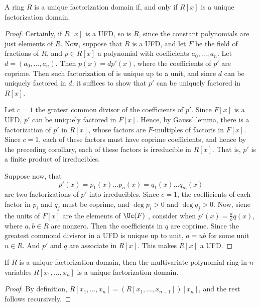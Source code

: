 \begin{theorem}\label{3.2.2}
    A ring $R$ is a unique factorization domain if, and only if  $R[x]$ is a
    unique factorization domain.
\end{theorem}
\begin{proof}
    Certainly, if $R[x]$ is a UFD, so is $R$, since the constant polynomials
    are just elements of  $R$. Now, suppose that  $R$ is a UFD, and let  $F$ be
    the field of fractions of  $R$, and  $p \in R[x]$ a polynomial with
    coefficients $a_0, \dots, a_n$. Let $d=(a_0, \dots, a_n)$. Then
    $p(x)=dp'(x)$, where the coefficients of $p'$ are coprime. Then such
    factorization of is unique up to a unit, and since $d$ can be uniquely
    factored in  $d$, it suffices to show that  $p'$ can be uniquely factored in
     $R[x]$.

     Let $c=1$ the gratest common divisor of the coefficients of  $p'$. Since
     $F[x]$ is a UFD, $p'$ can be uniquely factored in  $F[x]$. Hence, by
     Gauss' lemma, there is a factorization of $p'$ in  $R[x]$, whose factors
     are $F$-multiples of factoris in  $F[x]$. Since $c=1$, each of these
     factors must have coprime coefficients, and hence by the preceding
     corollary, each of these factors is irreducible in $R[x]$. That is, $p'$ is
     a finite product of irreducibles.

     Suppose now, that
     \begin{equation*}
      p'(x)=p_1(x) \dots p_n(x)=q_1(x) \dots q_m(x)
     \end{equation*}
     are two factorizations of $p'$ into irreducibles. Since  $c=1$, the
     coefficients of each factor in $p_i$ and  $q_j$ must be coprime, and
     $\deg{p_i}>0$ and $\deg{q_j}>0$. Now, sicne the units of $F[x]$ are the
     elements of $\Uc(F)$ , consider when $p'(x)=\frac{a}{b}q(x)$, where $a,b
     \in R$ are nonzero. Then the coefficients in $q$ are coprime. Since the
     greatest commond divisror in a UFD is unique up to unit,  $a=ub$ for some
     unit  $u \in R$. And  $p'$ and $q$ are associate in $R[x]$. This makes
     $R[x]$ a UFD.
\end{proof}
\begin{corollary}
    If $R$ is a unique factorization domain, then the multivariate polynomial
    ring in  $n$-variables  $R[x_1, \dots, x_n]$ is a unique factorization
    domain.
\end{corollary}
\begin{proof}
    By definition, $R[x_1, \dots, x_n]=(R[x_1, \dots, x_{n-1}])[x_n]$, and the
    rest follows recursively.
\end{proof}

